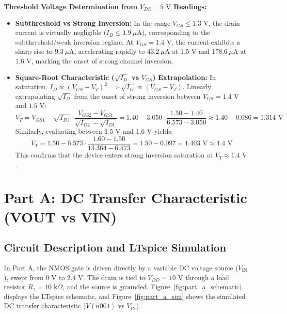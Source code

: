 \documentclass[11pt,a4paper]{article}
\begin{document}
\noindent \textbf{Threshold Voltage Determination from $V_{DS} = 5\text{ V}$ Readings:}
\begin{itemize}
    \item \textbf{Subthreshold vs Strong Inversion:} In the range $V_{GS} \le 1.3\text{ V}$, the drain current is virtually negligible ($I_D \le 1.9\ \mu\text{A}$), corresponding to the subthreshold/weak inversion regime. At $V_{GS} = 1.4\text{ V}$, the current exhibits a sharp rise to $9.3\ \mu\text{A}$, accelerating rapidly to $43.2\ \mu\text{A}$ at $1.5\text{ V}$ and $178.6\ \mu\text{A}$ at $1.6\text{ V}$, marking the onset of strong channel inversion.
    \item \textbf{Square-Root Characteristic ($\sqrt{I_D}$ vs $V_{GS}$) Extrapolation:} In saturation, $I_D \propto (V_{GS} - V_T)^2 \implies \sqrt{I_D} \propto (V_{GS} - V_T)$. Linearly extrapolating $\sqrt{I_D}$ from the onset of strong inversion between $V_{GS} = 1.4\text{ V}$ and $1.5\text{ V}$:
    \begin{equation}
        V_T = V_{GS1} - \sqrt{I_{D1}} \cdot \frac{V_{GS2} - V_{GS1}}{\sqrt{I_{D2}} - \sqrt{I_{D1}}} = 1.40 - 3.050 \cdot \frac{1.50 - 1.40}{6.573 - 3.050} \approx 1.40 - 0.086 = 1.314\text{ V}
    \end{equation}
    Similarly, evaluating between $1.5\text{ V}$ and $1.6\text{ V}$ yields:
    \begin{equation}
        V_T = 1.50 - 6.573 \cdot \frac{1.60 - 1.50}{13.364 - 6.573} = 1.50 - 0.097 = 1.403\text{ V} \approx 1.4\text{ V}
    \end{equation}
    This confirms that the device enters strong inversion saturation at \textbf{$V_T \approx 1.4\text{ V}$}.
\end{itemize}

\newpage
\section{Part A: DC Transfer Characteristic (VOUT vs VIN)}

\subsection{Circuit Description and LTspice Simulation}
In Part A, the NMOS gate is driven directly by a variable DC voltage source ($V_{\text{IN}}$), swept from $0\text{ V}$ to $2.4\text{ V}$. The drain is tied to $V_{DD} = 10\text{ V}$ through a load resistor $R_1 = 10\text{ k}\Omega$, and the source is grounded. Figure~\ref{fig:part_a_schematic} displays the LTspice schematic, and Figure~\ref{fig:part_a_sim} shows the simulated DC transfer characteristic ($V(n001)$ vs $V_{\text{IN}}$).
\end{document}
